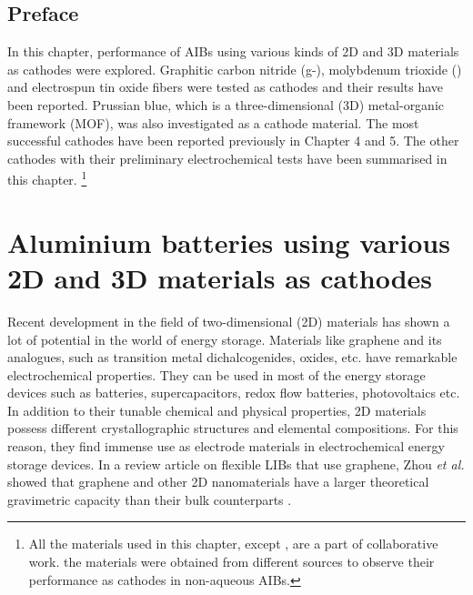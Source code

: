 \section*{Preface}
In this chapter, performance of AIBs using various kinds of 2D and 3D materials as cathodes were explored. Graphitic carbon nitride (g-), molybdenum trioxide () and electrospun tin oxide  fibers were tested as cathodes and their results have been reported. Prussian blue, which is a three-dimensional (3D) metal-organic framework (MOF), was also investigated as a cathode material. The most successful cathodes have been reported previously in Chapter 4 and 5. The other cathodes with their preliminary electrochemical tests have been summarised in this chapter. \footnote{All the materials used in this chapter, except , are a part of collaborative work. the  materials were obtained from different sources to observe their performance as cathodes in non-aqueous AIBs.} 
\pagebreak
\chapter{Aluminium batteries using various 2D and 3D materials as cathodes} 
\label{chap6} 
Recent development in the field of two-dimensional (2D) materials has shown a lot of potential in the world of energy storage. Materials like graphene and its analogues, such as transition metal dichalcogenides, oxides, etc. have remarkable electrochemical properties. They can be used in most of the energy storage devices such as batteries, supercapacitors, redox flow batteries, photovoltaics etc. In addition to their tunable chemical and physical properties, 2D materials possess different crystallographic structures and elemental compositions. For this reason, they find immense use as electrode materials in electrochemical energy storage devices\cite{wang_graphene_2009,bonaccorso_graphene_2015}. In a review article on flexible LIBs that use graphene, Zhou \textit{et al.} showed that graphene and other 2D nanomaterials have a larger theoretical gravimetric capacity than their bulk counterparts \cite{zhou_progress_2014}. \\

